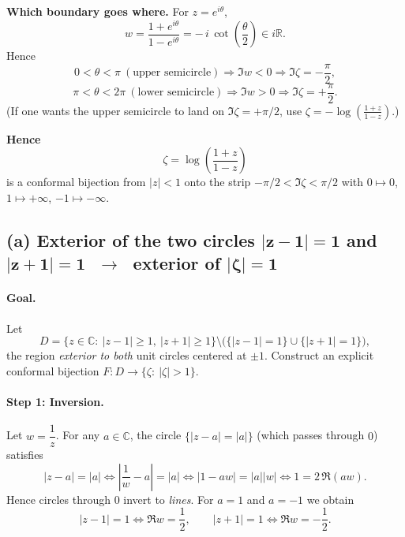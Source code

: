 \documentclass[11pt]{article}
\begin{document}
	\medskip
	\textbf{Which boundary goes where.}
	For $z=e^{i\theta}$,
	\[
	w=\frac{1+e^{i\theta}}{1-e^{i\theta}}
	= -\,i\,\cot\!\left(\frac{\theta}{2}\right)\in i\mathbb{R}.
	\]
	Hence
	\[
	0<\theta<\pi\ (\text{upper semicircle}) \Rightarrow \Im w<0 \Rightarrow \Im \zeta=-\frac{\pi}{2},
	\]
	\[
	\pi<\theta<2\pi\ (\text{lower semicircle}) \Rightarrow \Im w>0 \Rightarrow \Im \zeta=+\frac{\pi}{2}.
	\]
	(If one wants the upper semicircle to land on $\Im\zeta=+\pi/2$, use $\zeta=-\log\!\left(\frac{1+z}{1-z}\right)$.)
	
	\medskip
	\textbf{Hence}
	\[
	\boxed{\ \zeta=\log\!\left(\frac{1+z}{1-z}\right)\ }
	\]
	is a conformal bijection from $|z|<1$ onto the strip $-\pi/2<\Im\zeta<\pi/2$ with
	$0\mapsto 0$, $1\mapsto +\infty$, $-1\mapsto -\infty$.
	
	
	
	\subsection*{(a) Exterior of the two circles $\boldsymbol{|z-1|=1}$ and $\boldsymbol{|z+1|=1}$ 
		$\;\longrightarrow\;$ exterior of $\boldsymbol{|\zeta|=1}$}
	
	\paragraph{Goal.}
	Let
	\[
	D=\big\{z\in\mathbb C:\ |z-1|\ge 1,\ |z+1|\ge 1\big\}\setminus\big(\{|z-1|=1\}\cup\{|z+1|=1\}\big),
	\]
	the region \emph{exterior to both} unit circles centered at $\pm1$.
	Construct an explicit conformal bijection $F:D\to\{\zeta:\ |\zeta|>1\}$.
	
	\paragraph{Step 1: Inversion.}
	Let $w=\dfrac{1}{z}$.
	For any $a\in\mathbb C$, the circle $\{|z-a|=|a|\}$ (which passes through $0$) satisfies
	\[
	|z-a|=|a|
	\iff \left|\frac{1}{w}-a\right|=|a|
	\iff |1-aw|=|a||w|
	\iff 1=2\,\Re(aw).
	\]
	Hence circles through $0$ invert to \emph{lines}.
	For $a=1$ and $a=-1$ we obtain
	\[
	|z-1|=1 \iff \Re w=\frac{1}{2},
	\qquad
	|z+1|=1 \iff \Re w=-\frac{1}{2}.
	\]
	
\end{document}
